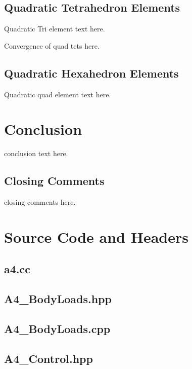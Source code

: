 \documentclass[a4paper, 12pt]{article}
\begin{document}
\subsection{Quadratic Tetrahedron Elements} \label{subsec:quadTet}
Quadratic Tri element text here.

Convergence of quad tets here.

\subsection{Quadratic Hexahedron Elements} \label{subsec:quadHex}
Quadratic quad element text here.

\section{Conclusion} \label{sec:conclusion}
conclusion text here.

\subsection{Closing Comments} \label{sec:comments}
closing comments here.

\newpage
\appendix
\section{Source Code and Headers} \label{sec:code}

\subsection{a4.cc} \label{subsec:a4.cc}


\subsection{A4\_BodyLoads.hpp} \label{subsec:BLhpp}


\subsection{A4\_BodyLoads.cpp} \label{subsec:BLcpp}


\subsection{A4\_Control.hpp} \label{subsec:Cont.hpp}

\end{document}
